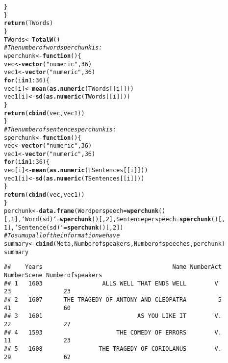 \documentclass{article}\usepackage[]{graphicx}\usepackage[]{color}
\makeatletter
\newcommand{\hlnum}[1]{\textcolor[rgb]{0.686,0.059,0.569}{#1}}%
\newcommand{\hlstr}[1]{\textcolor[rgb]{0.192,0.494,0.8}{#1}}%
\newcommand{\hlcom}[1]{\textcolor[rgb]{0.678,0.584,0.686}{\textit{#1}}}%
\newcommand{\hlopt}[1]{\textcolor[rgb]{0,0,0}{#1}}%
\newcommand{\hlstd}[1]{\textcolor[rgb]{0.345,0.345,0.345}{#1}}%
\newcommand{\hlkwa}[1]{\textcolor[rgb]{0.161,0.373,0.58}{\textbf{#1}}}%
\newcommand{\hlkwb}[1]{\textcolor[rgb]{0.69,0.353,0.396}{#1}}%
\newcommand{\hlkwc}[1]{\textcolor[rgb]{0.333,0.667,0.333}{#1}}%
\newcommand{\hlkwd}[1]{\textcolor[rgb]{0.737,0.353,0.396}{\textbf{#1}}}%
\newenvironment{kframe}{%
 \def\at@end@of@kframe{}%
 \ifinner\ifhmode%
  \def\at@end@of@kframe{\end{minipage}}%
  \begin{minipage}{\columnwidth}%
 \fi\fi%
 \def\FrameCommand##1{\hskip\@totalleftmargin \hskip-\fboxsep
 \colorbox{shadecolor}{##1}\hskip-\fboxsep
     \hskip-\linewidth \hskip-\@totalleftmargin \hskip\columnwidth}%
 \MakeFramed {\advance\hsize-\width
   \@totalleftmargin\z@ \linewidth\hsize
   \@setminipage}}%
 {\par\unskip\endMakeFramed%
 \at@end@of@kframe}
\newenvironment{knitrout}{}{} %
\makeatother
\begin{document}
\begin{knitrout}
\begin{kframe}
\begin{alltt}
        \hlstd{\}}
    \hlstd{\}}
    \hlkwd{return}\hlstd{(TWords)}
\hlstd{\}}
\hlstd{TWords} \hlkwb{<-} \hlkwd{TotalW}\hlstd{()}
\hlcom{# The number of words per chunk is:}
\hlstd{wperchunk} \hlkwb{<-} \hlkwa{function}\hlstd{() \{}
    \hlstd{vec} \hlkwb{<-} \hlkwd{vector}\hlstd{(}\hlstr{"numeric"}\hlstd{,} \hlnum{36}\hlstd{)}
    \hlstd{vec1} \hlkwb{<-} \hlkwd{vector}\hlstd{(}\hlstr{"numeric"}\hlstd{,} \hlnum{36}\hlstd{)}
    \hlkwa{for} \hlstd{(i} \hlkwa{in} \hlnum{1}\hlopt{:}\hlnum{36}\hlstd{) \{}
        \hlstd{vec[i]} \hlkwb{<-} \hlkwd{mean}\hlstd{(}\hlkwd{as.numeric}\hlstd{(TWords[[i]]))}
        \hlstd{vec1[i]} \hlkwb{<-} \hlkwd{sd}\hlstd{(}\hlkwd{as.numeric}\hlstd{(TWords[[i]]))}
    \hlstd{\}}
    \hlkwd{return}\hlstd{(}\hlkwd{cbind}\hlstd{(vec, vec1))}
\hlstd{\}}
\hlcom{# The number of sentences per chunk is:}
\hlstd{sperchunk} \hlkwb{<-} \hlkwa{function}\hlstd{() \{}
    \hlstd{vec} \hlkwb{<-} \hlkwd{vector}\hlstd{(}\hlstr{"numeric"}\hlstd{,} \hlnum{36}\hlstd{)}
    \hlstd{vec1} \hlkwb{<-} \hlkwd{vector}\hlstd{(}\hlstr{"numeric"}\hlstd{,} \hlnum{36}\hlstd{)}
    \hlkwa{for} \hlstd{(i} \hlkwa{in} \hlnum{1}\hlopt{:}\hlnum{36}\hlstd{) \{}
        \hlstd{vec[i]} \hlkwb{<-} \hlkwd{mean}\hlstd{(}\hlkwd{as.numeric}\hlstd{(TSentences[[i]]))}
        \hlstd{vec1[i]} \hlkwb{<-} \hlkwd{sd}\hlstd{(}\hlkwd{as.numeric}\hlstd{(TSentences[[i]]))}
    \hlstd{\}}
    \hlkwd{return}\hlstd{(}\hlkwd{cbind}\hlstd{(vec, vec1))}
\hlstd{\}}
\hlstd{perchunk} \hlkwb{<-} \hlkwd{data.frame}\hlstd{(}\hlkwc{Wordperspeech} \hlstd{=} \hlkwd{wperchunk}\hlstd{()[,} \hlnum{1}\hlstd{],} \hlkwc{`Word(sd)`} \hlstd{=} \hlkwd{wperchunk}\hlstd{()[,} \hlnum{2}\hlstd{],} \hlkwc{Sentenceperspeech} \hlstd{=} \hlkwd{sperchunk}\hlstd{()[,}
    \hlnum{1}\hlstd{],} \hlkwc{`Sentence(sd)`} \hlstd{=} \hlkwd{sperchunk}\hlstd{()[,} \hlnum{2}\hlstd{])}
\hlcom{# To sum up all of the information we have}
\hlstd{summary} \hlkwb{<-} \hlkwd{cbind}\hlstd{(Meta, Numberofspeakers, Numberofspeeches, perchunk)}
\hlstd{summary}
\end{alltt}
\begin{verbatim}
##    Years                                     Name NumberAct NumberScene Numberofspeakers
## 1   1603                 ALLS WELL THAT ENDS WELL        V           23               23
## 2   1607      THE TRAGEDY OF ANTONY AND CLEOPATRA         5          41               60
## 3   1601                           AS YOU LIKE IT        V.          22               27
## 4   1593                     THE COMEDY OF ERRORS        V.          11               23
## 5   1608                THE TRAGEDY OF CORIOLANUS        V.          29               62

\end{verbatim}
\end{kframe}
\end{knitrout}
\end{document}
